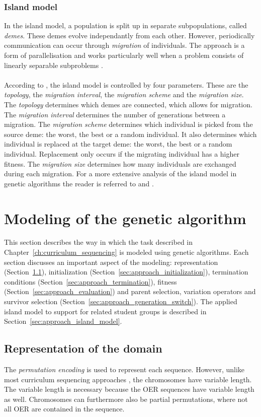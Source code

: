 \subsubsection{Island model}
In the island model, a population is split up in separate subpopulations,
called \emph{demes}. These demes evolve independantly from each other.
However, periodically communication can occur through \emph{migration} of
individuals. The approach is a form of parallelisation and works particularly
well when a problem consists of linearly separable subproblems
\citep{Whitley1999}.\\\\
\noindent
According to \citep{Nowostawski1999}, the island model is controlled by
four parameters. These are the \emph{topology}, the \emph{migration interval}, the
\emph{migration scheme} and the \emph{migration size}. The \emph{topology}
determines which demes are connected, which allows for migration. The
\emph{migration interval} determines the number of generations between a
migration. The \emph{migration scheme} determines which individual is picked
from the source deme: the worst, the best or a random individual. It also
determines which individual is replaced at the target deme: the worst, the best
or a random individual. Replacement only occurs if the migrating individual has a higher fitness. The \emph{migration size} determines how many individuals are
exchanged during each migration. For a more extensive analysis of the island model in genetic algorithms the reader is referred to \citep{Martin1997} and \citep{Whitley1999}.

\section{Modeling of the genetic algorithm}
This section describes the way in which the task described in
Chapter~\ref{ch:curriculum_sequencing} is modeled using genetic algorithms.
Each section discusses an important aspect of the modeling: representation
(Section~\ref{sec:approach_representation}), initialization
(Section~\ref{sec:approach_initialization}), termination conditions
(Section~\ref{sec:approach_termination}), fitness
(Section~\ref{sec:approach_evaluation}) and parent selection, variation
operators and survivor selection
(Section~\ref{sec:approach_generation_switch}). The applied island model to
support for related student groups is described in
Section~\ref{sec:approach_island_model}.

\subsection{Representation of the domain}
\label{sec:approach_representation}
The \emph{permutation encoding} is used to represent each
sequence. However, unlike most curriculum sequencing approaches
\citep{AlMuhaideb2011}, the chromosomes have variable length. The variable
length is necessary because the OER sequences have variable length as well.
Chromosomes can furthermore also be partial permutations, where not all OER are
contained in the sequence.
